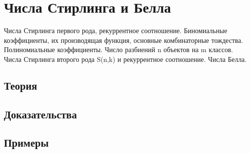 
\section{Числа Стирлинга и Белла}
\label{sec:2.2.07-stirling-bell}

\begin{ticket}
Числа Стирлинга первого рода, рекуррентное соотношение. Биномиальные коэффициенты, их производящая функция, основные комбинаторные тождества. Полиномиальные коэффициенты. Число разбиений n объектов на m классов. Числа Стирлинга второго рода S(n,k) и рекуррентное соотношение. Числа Белла.
\end{ticket}

\subsection*{Теория}

\subsection*{Доказательства}

\subsection*{Примеры}
